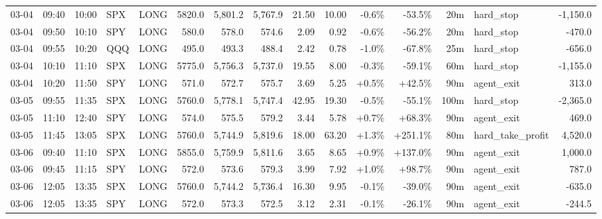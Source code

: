 \documentclass[11pt,a4paper,twoside]{article}
\begin{document}
\begin{landscape}
\begin{center}
\begin{longtable}{>{\color{txtmain}}l l l l l r r r r r r r r >{\color{txtmain}}l r}
03-04 & 09:40 & 10:00 & SPX & LONG & 5820.0 & 5,801.2 & 5,767.9 & 21.50 & 10.00 & \textcolor{lossred}{-0.6\%} & \textcolor{lossred}{-53.5\%} & 20m & hard\_stop & \textcolor{lossred}{-1,150.0} \\
03-04 & 09:50 & 10:10 & SPY & LONG & 580.0 & 578.0 & 574.6 & 2.09 & 0.92 & \textcolor{lossred}{-0.6\%} & \textcolor{lossred}{-56.2\%} & 20m & hard\_stop & \textcolor{lossred}{-470.0} \\
03-04 & 09:55 & 10:20 & QQQ & LONG & 495.0 & 493.3 & 488.4 & 2.42 & 0.78 & \textcolor{lossred}{-1.0\%} & \textcolor{lossred}{-67.8\%} & 25m & hard\_stop & \textcolor{lossred}{-656.0} \\
03-04 & 10:10 & 11:10 & SPX & LONG & 5775.0 & 5,756.3 & 5,737.0 & 19.55 & 8.00 & \textcolor{lossred}{-0.3\%} & \textcolor{lossred}{-59.1\%} & 60m & hard\_stop & \textcolor{lossred}{-1,155.0} \\
03-04 & 10:20 & 11:50 & SPY & LONG & 571.0 & 572.7 & 575.7 & 3.69 & 5.25 & \textcolor{wingreen}{+0.5\%} & \textcolor{wingreen}{+42.5\%} & 90m & agent\_exit & \textcolor{wingreen}{313.0} \\
03-05 & 09:55 & 11:35 & SPX & LONG & 5760.0 & 5,778.1 & 5,747.4 & 42.95 & 19.30 & \textcolor{lossred}{-0.5\%} & \textcolor{lossred}{-55.1\%} & 100m & hard\_stop & \textcolor{lossred}{-2,365.0} \\
03-05 & 11:10 & 12:40 & SPY & LONG & 574.0 & 575.5 & 579.2 & 3.44 & 5.78 & \textcolor{wingreen}{+0.7\%} & \textcolor{wingreen}{+68.3\%} & 90m & agent\_exit & \textcolor{wingreen}{469.0} \\
03-05 & 11:45 & 13:05 & SPX & LONG & 5760.0 & 5,744.9 & 5,819.6 & 18.00 & 63.20 & \textcolor{wingreen}{+1.3\%} & \textcolor{wingreen}{+251.1\%} & 80m & hard\_take\_profit & \textcolor{wingreen}{4,520.0} \\
03-06 & 09:40 & 11:10 & SPX & LONG & 5855.0 & 5,759.9 & 5,811.6 & 3.65 & 8.65 & \textcolor{wingreen}{+0.9\%} & \textcolor{wingreen}{+137.0\%} & 90m & agent\_exit & \textcolor{wingreen}{1,000.0} \\
03-06 & 09:45 & 11:15 & SPY & LONG & 572.0 & 573.6 & 579.3 & 3.99 & 7.92 & \textcolor{wingreen}{+1.0\%} & \textcolor{wingreen}{+98.7\%} & 90m & agent\_exit & \textcolor{wingreen}{787.0} \\
03-06 & 12:05 & 13:35 & SPX & LONG & 5760.0 & 5,744.2 & 5,736.4 & 16.30 & 9.95 & \textcolor{lossred}{-0.1\%} & \textcolor{lossred}{-39.0\%} & 90m & agent\_exit & \textcolor{lossred}{-635.0} \\
03-06 & 12:05 & 13:35 & SPY & LONG & 572.0 & 573.3 & 572.5 & 3.12 & 2.31 & \textcolor{lossred}{-0.1\%} & \textcolor{lossred}{-26.1\%} & 90m & agent\_exit & \textcolor{lossred}{-244.5} \\

\end{longtable}
\end{center}
\end{landscape}
\end{document}
